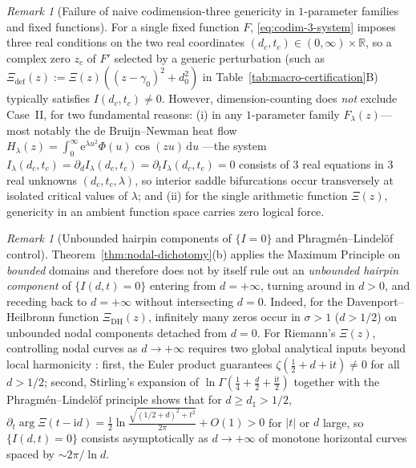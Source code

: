 \documentclass[11pt,reqno]{amsart}
\theoremstyle{definition}
\theoremstyle{remark}
\newtheorem{remark}[theorem]{Remark}
\numberwithin{equation}{section}
\newcommand{\dd}{\mathrm{d}}
\newcommand{\ii}{\mathrm{i}}
\newcommand{\ee}{\mathrm{e}}
\newcommand{\DHf}{\mathrm{DH}}
\newcommand{\defm}{\mathrm{def}}
\begin{document}
\begin{remark}[Failure of naive codimension-three genericity in $1$-parameter families and fixed functions]\label{rem:codim3-fallacy}
For a single fixed function $F$, \eqref{eq:codim-3-system} imposes three real conditions on the two real coordinates $(d_c,t_c) \in (0,\infty)\times\mathbb{R}$, so a complex zero $z_c$ of $F'$ selected by a generic perturbation (such as $\Xi_{\defm}(z) := \Xi(z)((z-\gamma_0)^2 + d_0^2)$ in Table~\ref{tab:macro-certification}B) typically satisfies $I(d_c,t_c) \ne 0$. However, dimension-counting does \emph{not} exclude Case~II, for two fundamental reasons: (i) in any $1$-parameter family $F_\lambda(z)$---most notably the de Bruijn--Newman heat flow $H_\lambda(z) = \int_0^\infty \ee^{\lambda u^2}\Phi(u)\cos(zu)\,\dd u$ \cite{Newman1976,RodgersTao2020}---the system $I_\lambda(d_c,t_c) = \partial_d I_\lambda(d_c,t_c) = \partial_t I_\lambda(d_c,t_c) = 0$ consists of $3$ real equations in $3$ real unknowns $(d_c,t_c,\lambda)$, so interior saddle bifurcations occur transversely at isolated critical values of $\lambda$; and (ii) for the single arithmetic function $\Xi(z)$, genericity in an ambient function space carries zero logical force.
\end{remark}

\begin{remark}[Unbounded hairpin components of $\{I=0\}$ and Phragm\'{e}n--Lindel\"{o}f control]\label{rem:hairpin-caveat}
Theorem~\ref{thm:nodal-dichotomy}(b) applies the Maximum Principle on \emph{bounded} domains and therefore does not by itself rule out an \emph{unbounded hairpin component} of $\{I(d,t)=0\}$ entering from $d=+\infty$, turning around in $d>0$, and receding back to $d=+\infty$ without intersecting $d=0$. Indeed, for the Davenport--Heilbronn function $\Xi_{\DHf}(z)$, infinitely many zeros occur in $\sigma > 1$ ($d > 1/2$) \cite{DavenportHeilbronn1936,Titchmarsh1986} on unbounded nodal components detached from $d=0$. For Riemann's $\Xi(z)$, controlling nodal curves as $d \to +\infty$ requires two global analytical inputs beyond local harmonicity \cite{KiKim2000,Titchmarsh1986}: first, the Euler product guarantees $\zeta(\frac{1}{2}+d+\ii t)\ne 0$ for all $d > 1/2$; second, Stirling's expansion of $\ln\Gamma(\frac{1}{4}+\frac{d}{2}+\frac{\ii t}{2})$ together with the Phragm\'{e}n--Lindel\"{o}f principle shows that for $d \ge d_1 > 1/2$, $\partial_t\arg\Xi(t-\ii d) = \frac{1}{2}\ln\frac{\sqrt{(1/2+d)^2+t^2}}{2\pi} + O(1) > 0$ for $|t|$ or $d$ large, so $\{I(d,t)=0\}$ consists asymptotically as $d \to +\infty$ of monotone horizontal curves spaced by $\sim 2\pi/\ln d$.
\end{remark}
\end{document}
